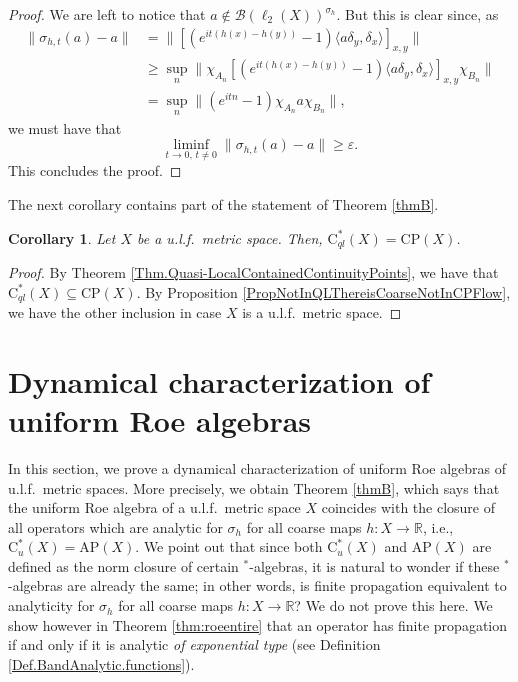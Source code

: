 \documentclass[11pt]{amsart}
\newcommand{\R}{\mathbb{R}}
\newcommand{\cB}{\mathcal{B}}
\newcommand{\eps}{\varepsilon}
\newcommand{\cstu}{\mathrm{C}^*_u}
\newcommand{\cstql}{\mathrm{C}^*_{\textit{ql}}}
\newcommand{\CP}{\mathrm{CP}}
\numberwithin{equation}{section}
\newtheorem{corollary}[theorem]{Corollary}
\theoremstyle{definition}
\theoremstyle{remark}
\begin{document}
\begin{proof}
    We are left to notice that $a\not\in \cB(\ell_2(X))^{\sigma_h}$. But this is clear since, as
    \begin{align*}
   \|\sigma_{h,t}(a)-a\|&=\|[(e^{it(h(x)-h(y))}-1)\langle a\delta_y,\delta_x\rangle]_{x,y} \|
   \\
&\geq \sup_n\|\chi_{A_n}[(e^{it(h(x)-h(y))}-1)\langle a\delta_y,\delta_x\rangle]_{x,y} \chi_{B_n}\|\\
   &
  = \sup_n\|(e^{itn} -1)\chi_{A_n}a\chi_{B_n}\|,
    \end{align*}
    we must have that
    \[\liminf_{t\to 0,\,t\neq 0}\|\sigma_{h,t}(a)-a\|\geq \eps.\]
    This concludes the proof.
\end{proof}



The next corollary contains part of the statement  of Theorem \ref{thmB}.

\begin{corollary}\label{Cor.cstql=CP.metric}
    Let $X$ be a u.l.f.\ metric space. Then, $\cstql(X)=\CP(X)$.
\end{corollary}

\begin{proof}
By Theorem \ref{Thm.Quasi-LocalContainedContinuityPoints}, we have that $\cstql(X)\subseteq \CP(X)$. By  Proposition \ref{PropNotInQLThereisCoarseNotInCPFlow}, we have the other inclusion in case $X$ is a u.l.f.\ metric space.
\end{proof}



\section{Dynamical characterization of uniform Roe algebras}

In this section, we prove a dynamical characterization of uniform Roe algebras of u.l.f.\ metric spaces. More precisely,  we obtain Theorem \ref{thmB}, which says that the uniform Roe algebra of a u.l.f.\ metric space  $X$ coincides with the closure of all operators which are analytic for $\sigma_h$ for all coarse maps $h\colon X\to \R$, i.e., $\cstu(X)=\mathrm{AP}(X)$. We point out that since both $\cstu(X)$ and $\mathrm{AP}(X)$ are defined as the norm closure of certain $^*$-algebras, it is natural to wonder if these $^*$-algebras are already the same; in other words, 
is finite propagation equivalent to analyticity for $\sigma_h$ for all coarse maps $h\colon X\to \R$? We do not prove this here. We show however in Theorem \ref{thm:roeentire} that  an operator has finite propagation if and only if it is analytic \emph{of exponential type} (see Definition \ref{Def.BandAnalytic.functions}).\\
\end{document}
